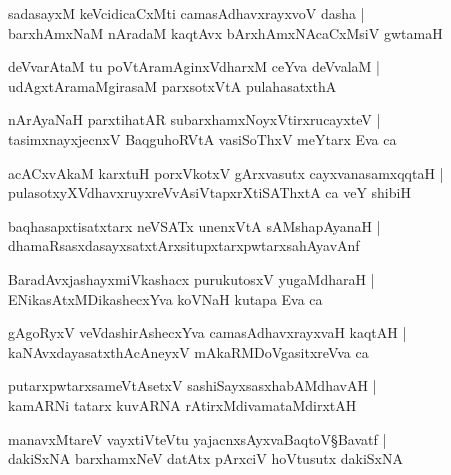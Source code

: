 \begin{shloka}
sadasayxM keVcidicaCxMti camasAdhavxrayxvoV dasha |\\
barxhAmxNaM nAradaM kaqtAvx bArxhAmxNAcaCxMsiV gwtamaH 
\end{shloka}

\begin{shloka}
deVvarAtaM tu poVtAramAginxVdharxM ceYva deVvalaM |\\
udAgxtAramaMgirasaM parxsotxVtA pulahasatxthA
\end{shloka}

\begin{shloka}
nArAyaNaH parxtihatAR subarxhamxNoyxVtirxrucayxteV |\\
tasimxnayxjecnxV BaqguhoRVtA vasiSoThxV meYtarx Eva ca 
\end{shloka}

\begin{shloka}
acACxvAkaM karxtuH porxVkotxV gArxvasutx cayxvanasamxqqtaH |\\
pulasotxyXVdhavxruyxreVvAsiVtapxrXtiSAThxtA ca veY shibiH
\end{shloka}

\begin{shloka}
baqhasapxtisatxtarx neVSATx unenxVtA sAMshapAyanaH |\\
dhamaRsasxdasayxsatxtArxsitupxtarxpwtarxsahAyavAnf
\end{shloka}

\begin{shloka}
BaradAvxjashayxmiVkashacx purukutosxV yugaMdharaH |\\
ENikasAtxMDikashecxYva koVNaH kutapa Eva ca 
\end{shloka}

\begin{shloka}
gAgoRyxV veVdashirAshecxYva camasAdhavxrayxvaH kaqtAH |\\
kaNAvxdayasatxthAcAneyxV mAkaRMDoVgasitxreVva ca
\end{shloka}

\begin{shloka}
putarxpwtarxsameVtAsetxV sashiSayxsasxhabAMdhavAH |\\
kamARNi tatarx kuvARNA rAtirxMdivamataMdirxtAH 
\end{shloka}

\begin{shloka}
manavxMtareV vayxtiVteVtu yajacnxsAyxvaBaqtoV\S Bavatf |\\
dakiSxNA barxhamxNeV datAtx pArxciV hoVtusutx dakiSxNA
\end{shloka}

